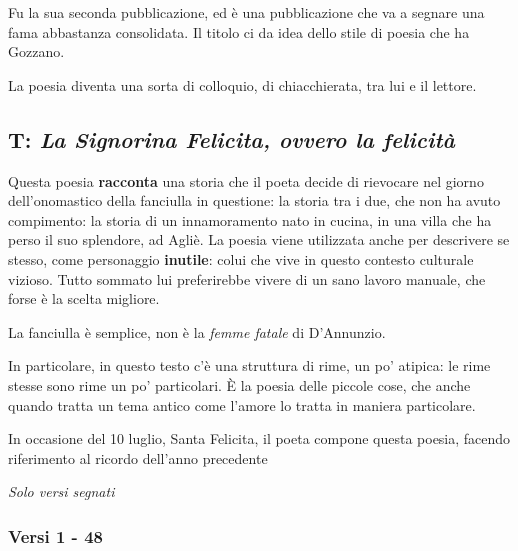 Fu la sua seconda pubblicazione, ed è una pubblicazione che va a segnare una fama abbastanza consolidata.
Il titolo ci da idea dello stile di poesia che ha Gozzano.

La poesia diventa una sorta di colloquio, di chiacchierata, tra lui e il lettore.

\subsection{T: \textit{La Signorina Felicita, ovvero la felicità}}

Questa poesia \textbf{racconta} una storia che il poeta decide di rievocare nel giorno dell’onomastico della fanciulla in questione: la storia tra i due, che non ha avuto compimento: la storia di un innamoramento nato in cucina, in una villa che ha perso il suo splendore, ad Agliè.
La poesia viene utilizzata anche per descrivere se stesso, come personaggio \textbf{inutile}: colui che vive in questo contesto culturale vizioso. Tutto sommato lui preferirebbe vivere di un sano lavoro manuale, che forse è la scelta migliore.

La fanciulla è semplice, non è la \textit{femme fatale} di D’Annunzio.

In particolare, in questo testo c’è una struttura di rime, un po’ atipica: le rime stesse sono rime un po’ particolari. È la poesia delle piccole cose, che anche quando tratta un tema antico come l’amore lo tratta in maniera particolare.

In occasione del 10 luglio, Santa Felicita, il poeta compone questa poesia, facendo riferimento al ricordo dell’anno precedente

\emph{Solo versi segnati}

\subsubsection{Versi 1 - 48}

